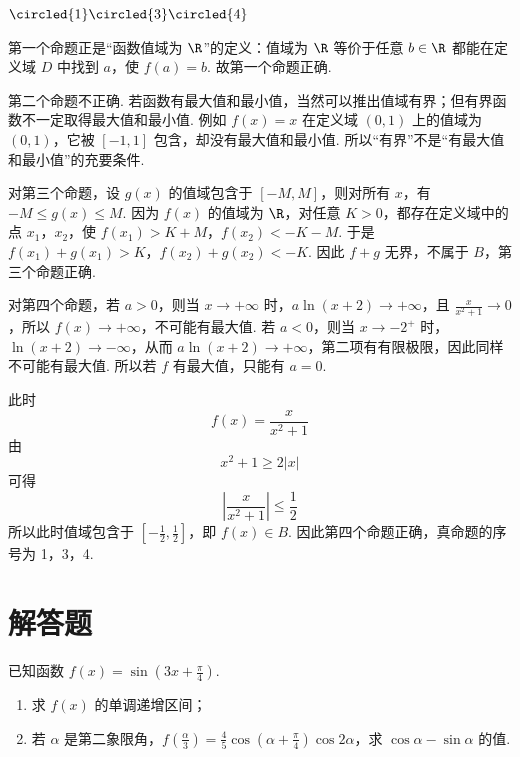 \begin{answer}
\(\circled{1}\circled{3}\circled{4}\)
\end{answer}

\begin{solution}
第一个命题正是“函数值域为 \(\R\)”的定义：值域为 \(\R\) 等价于任意 \(b\in\R\) 都能在定义域 \(D\) 中找到 \(a\)，使 \(f(a)=b\). 故第一个命题正确.

第二个命题不正确. 若函数有最大值和最小值，当然可以推出值域有界；但有界函数不一定取得最大值和最小值. 例如 \(f(x)=x\) 在定义域 \((0,1)\) 上的值域为 \((0,1)\)，它被 \([-1,1]\) 包含，却没有最大值和最小值. 所以“有界”不是“有最大值和最小值”的充要条件.

对第三个命题，设 \(g(x)\) 的值域包含于 \([-M,M]\)，则对所有 \(x\)，有 \(-M\leqslant g(x)\leqslant M\). 因为 \(f(x)\) 的值域为 \(\R\)，对任意 \(K>0\)，都存在定义域中的点 \(x_1\)，\(x_2\)，使
\(f(x_1)>K+M\)，\(f(x_2)<-K-M\).
于是
\(f(x_1)+g(x_1)>K\)，\(f(x_2)+g(x_2)<-K\).
因此 \(f+g\) 无界，不属于 \(B\)，第三个命题正确.

对第四个命题，若 \(a>0\)，则当 \(x\to+\infty\) 时，\(a\ln(x+2)\to+\infty\)，且 \(\frac{x}{x^2+1}\to0\)，所以 \(f(x)\to+\infty\)，不可能有最大值. 若 \(a<0\)，则当 \(x\to-2^+\) 时，\(\ln(x+2)\to-\infty\)，从而 \(a\ln(x+2)\to+\infty\)，第二项有有限极限，因此同样不可能有最大值. 所以若 \(f\) 有最大值，只能有 \(a=0\).

此时
\[
f(x)=\frac{x}{x^2+1}
\]
由
\[
x^2+1\geqslant2|x|
\]
可得
\[
\left|\frac{x}{x^2+1}\right|\leqslant\frac12
\]
所以此时值域包含于 \([-\frac12,\frac12]\)，即 \(f(x)\in B\). 因此第四个命题正确，真命题的序号为 1，3，4.
\end{solution}

\section{解答题}

\begin{problem}
已知函数 \( f(x) = \sin \left(3x + \frac{\pi}{4}\right) \).
\begin{enumerate}
\item 求 \( f(x) \) 的单调递增区间；
\item 若 \(\alpha\) 是第二象限角，\(f\left(\frac{\alpha}{3}\right) = \frac{4}{5}\cos \left(\alpha + \frac{\pi}{4}\right)\cos 2\alpha\)，求 \(\cos \alpha - \sin \alpha\) 的值.
\end{enumerate}
\end{problem}


